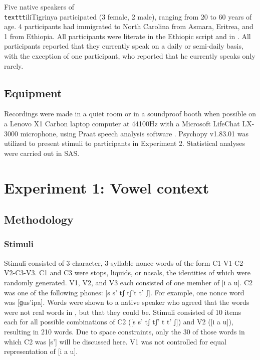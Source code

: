 \documentclass[output=paper
,newtxmath
,modfonts
,nonflat]{langsci/langscibook}
\begin{document}
Five native speakers of \texttt{\\texttt{}}ili{Tigrinya} participated (3 female, 2 male), ranging from 20 to 60 years of age. 4 participants had immigrated to North Carolina from Asmara, Eritrea, and 1 from Ethiopia. All participants were literate in the Ethiopic script and in . All participants reported that they currently speak  on a daily or semi-daily basis, with the exception of one participant, who reported that he currently speaks  only rarely.

\subsection{Equipment}\label{sec:moeng:4.2}

Recordings were made in a quiet room or in a soundproof booth when possible on a Lenovo X1 Carbon laptop computer at 44100Hz with a Microsoft LifeChat LX-3000 microphone, using Praat speech analysis software \citep{boersma2013praat}. Psychopy v1.83.01 \citep{peirce2007psychopy} was utilized to present stimuli to participants in Experiment 2. Statistical analyses were carried out in SAS.

\section{Experiment 1: Vowel context}\label{sec:moeng:5}

\subsection{Methodology}\label{sec:moeng:5.1}
\subsubsection{Stimuli}\label{sec:moeng:5.1.1}

Stimuli consisted of 3-character, 3-syllable nonce words of the form C1-V1-C2-V2-C3-V3. C1 and C3 were stops, liquids, or nasals, the identities of which were randomly generated. V1, V2, and V3 each consisted of one member of [i a u]. C2 was one of the following phones: [s s’ tʃ tʃ’t t’ ʃ]. For example, one nonce word was  [ɡus’ipa]. Words were shown to a native speaker who agreed that the words were not real words in , but that they could be. Stimuli consisted of 10 items each for all possible combinations of C2 ([s s’ tʃ tʃ’ t t’ ʃ]) and V2 ([i a u]), resulting in 210 words. Due to space constraints, only the 30 of those words in which C2 was [s’] will be discussed here. V1 was not controlled for equal representation of [i a u].
\end{document}
